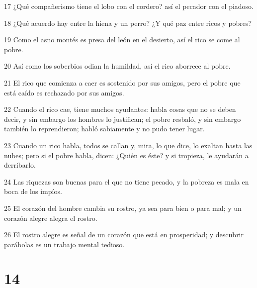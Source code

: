 \par 17 ¿Qué compañerismo tiene el lobo con el cordero? así el pecador con el piadoso.
\par 18 ¿Qué acuerdo hay entre la hiena y un perro? ¿Y qué paz entre ricos y pobres?
\par 19 Como el asno montés es presa del león en el desierto, así el rico se come al pobre.
\par 20 Así como los soberbios odian la humildad, así el rico aborrece al pobre.
\par 21 El rico que comienza a caer es sostenido por sus amigos, pero el pobre que está caído es rechazado por sus amigos.
\par 22 Cuando el rico cae, tiene muchos ayudantes: habla cosas que no se deben decir, y sin embargo los hombres lo justifican; el pobre resbaló, y sin embargo también lo reprendieron; habló sabiamente y no pudo tener lugar.
\par 23 Cuando un rico habla, todos se callan y, mira, lo que dice, lo exaltan hasta las nubes; pero si el pobre habla, dicen: ¿Quién es éste? y si tropieza, le ayudarán a derribarlo.
\par 24 Las riquezas son buenas para el que no tiene pecado, y la pobreza es mala en boca de los impíos.
\par 25 El corazón del hombre cambia su rostro, ya sea para bien o para mal; y un corazón alegre alegra el rostro.
\par 26 El rostro alegre es señal de un corazón que está en prosperidad; y descubrir parábolas es un trabajo mental tedioso.

\chapter{14}

